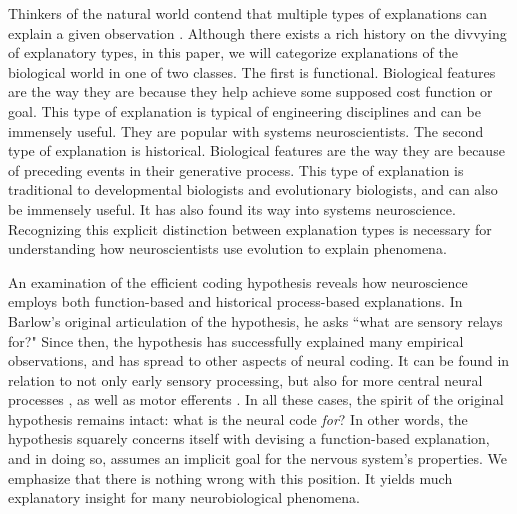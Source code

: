 \documentclass[twocolumn]{article}
\begin{document}
    

Thinkers of the natural world contend that multiple types of explanations can explain a given observation \cite{2017physics, aristotle1998metaphysics, mayr_1961, tinbergen_1963, hladky_2013}. Although there exists a rich history on the divvying of explanatory types, in this paper, we will categorize explanations of the biological world in one of two classes. The first is functional. Biological features are the way they are because they help achieve some supposed cost function or goal. This type of explanation is typical of engineering disciplines and can be immensely useful. They are popular with systems neuroscientists. The second type of explanation is historical. Biological features are the way they are because of preceding events in their generative process. This type of explanation is traditional to developmental biologists and evolutionary biologists, and can also be immensely useful. It has also found its way into systems neuroscience. Recognizing this explicit distinction between explanation types is necessary for understanding how neuroscientists use evolution to explain phenomena. 

An examination of the efficient coding hypothesis reveals how neuroscience employs both function-based and historical process-based explanations. In Barlow's original articulation of the hypothesis, he asks ``what are sensory relays for?" \cite{Barlow_1961} Since then, the hypothesis has successfully explained many empirical observations, and has spread to other aspects of neural coding. It can be found in relation to not only early sensory processing, but also for more central neural processes \cite{olshausen_field_1996, Pitkow_Meister_2012, brunton_2013}, as well as motor efferents \cite{hoyt_taylor_1981, sparrow_newell_1998, Mimica_Dunn_Tombaz_Bojja_Whitlock_2018}. In all these cases, the spirit of the original hypothesis remains intact: what is the neural code \textit{for}? In other words, the hypothesis squarely concerns itself with devising a function-based explanation, and in doing so, assumes an implicit goal for the nervous system's properties. We emphasize that there is nothing wrong with this position. It yields much explanatory insight for many neurobiological phenomena. 
\end{document}

